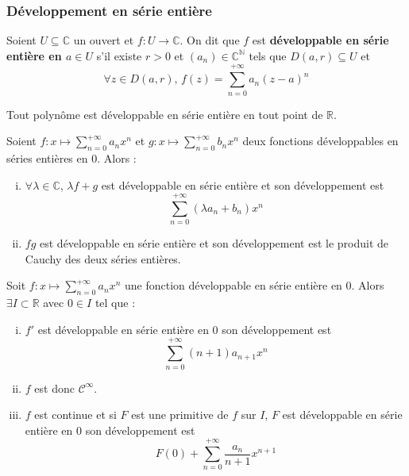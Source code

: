 	\subsubsection{Développement en série entière}
	
	
	\begin{definition}
		Soient $U \subseteq \mathbb{C}$ un ouvert et $f : U \rightarrow \mathbb{C}$. On dit que $f$ est \textbf{développable en série entière en $a \in U$} s'il existe $r > 0$ et $(a_n) \in \mathbb{C}^{\mathbb{N}}$ tels que $D(a, r) \subseteq U$ et
		\[ \forall z \in D(a, r), \, f(z) = \sum_{n=0}^{+\infty} a_n (z-a)^n \]
	\end{definition}
	
	
	\begin{example}
		Tout polynôme est développable en série entière en tout point de $\mathbb{R}$.
	\end{example}
	
	\begin{proposition}
		Soient $f : x \mapsto \sum_{n=0}^{+\infty} a_n x^n$ et $g : x \mapsto \sum_{n=0}^{+\infty} b_n x^n$ deux fonctions développables en séries entières en $0$. Alors :
		\begin{enumerate}[(i)]
			\item $\forall \lambda \in \mathbb{C}$, $\lambda f + g$ est développable en série entière et son développement est
			\[ \sum_{n=0}^{+\infty} (\lambda a_n + b_n) x^n \]
			\item $fg$ est développable en série entière et son développement est le produit de Cauchy des deux séries entières.
		\end{enumerate}
	\end{proposition}
	
	\begin{proposition}
		Soit $f : x \mapsto \sum_{n=0}^{+\infty} a_n x^n$ une fonction développable en série entière en $0$. Alors $\exists I \subset \mathbb{R}$ avec $0 \in I$ tel que :
		\begin{enumerate}[(i)]
			\item $f'$ est développable en série entière en $0$ son développement est
			\[ \sum_{n=0}^{+\infty} (n+1) a_{n+1} x^n \]
			\item $f$ est donc $\mathcal{C}^\infty$.
			\item $f$ est continue et si $F$ est une primitive de $f$ sur $I$, $F$ est développable en série entière en $0$ son développement est
			\[ F(0) + \sum_{n=0}^{+\infty} \frac{a_n}{n+1} x^{n+1} \]
		\end{enumerate}
	\end{proposition}
	
